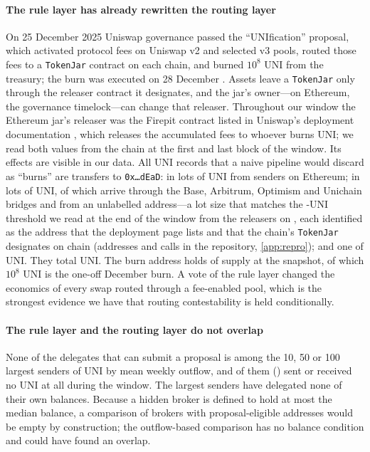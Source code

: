 \paragraph{The rule layer has already rewritten the routing layer}
On 25 December 2025 Uniswap governance passed the ``UNIfication'' proposal,
which activated protocol fees on Uniswap v2 and selected v3 pools, routed
those fees to a \texttt{TokenJar} contract on each chain, and burned $10^{8}$
UNI from the treasury; the burn was executed on 28 December
\cite{theblock2025unification, cointelegraph2025burn, uniswap2026fees}.
Assets leave a \texttt{TokenJar} only through the releaser contract it
designates, and the jar's owner---on Ethereum, the governance timelock---can
change that releaser. Throughout our window the Ethereum jar's releaser was the
Firepit contract listed in Uniswap's deployment documentation
\cite{uniswap2026deployments}, which releases the accumulated fees to whoever
burns  UNI; we read both values from the chain at
the first and last block of the window. Its effects are visible in our data.
All  UNI records that a naive pipeline would discard as
``burns'' are transfers to \texttt{0x\ldots dEaD}:  in lots
of  UNI from  senders on
Ethereum;  in lots of  UNI, of which
 arrive through the Base, Arbitrum, Optimism and
Unichain bridges and  from an unlabelled address---a lot
size that matches the -UNI threshold we read at the end
of the window from the releasers on , each identified as
the address that the deployment page lists and that the chain's
\texttt{TokenJar} designates on chain (addresses and calls in the
repository, \ref{app:repro}); and one of  UNI. They total  UNI. The burn address holds
 of supply at the snapshot, of which $10^{8}$ UNI is the
one-off December burn. A vote of the rule layer changed the economics of
every swap routed through a fee-enabled pool, which is the strongest
evidence we have that routing contestability is held conditionally.

\paragraph{The rule layer and the routing layer do not overlap}
None of the  delegates that can submit a proposal is
among the 10, 50 or 100 largest senders of UNI by mean weekly outflow, and
 of them () sent or received no
UNI at all during the window. The largest senders have delegated none of
their own balances. Because a hidden broker is defined to hold at most the
median balance, a comparison of brokers with proposal-eligible addresses
would be empty by construction; the outflow-based comparison has no balance
condition and could have found an overlap.

